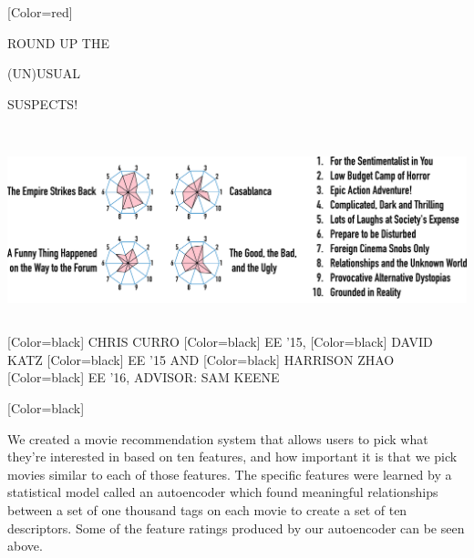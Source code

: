 \documentclass{article}
\begin{document}
\begin{minipage}[c]{28in}
{ 
[Color=red]
\fontsize{3.5in}{0.5in}\selectfont 
\bfseries





ROUND UP THE

\vspace{0.5in}

{ (UN)}USUAL 

\vspace{0.5in}

SUSPECTS!

}
\end{minipage}
\vspace{1in}\\
\colorbox{white}{
\begin{minipage}{28in}
\centering
\includegraphics[width=27in]{figure.pdf}
\end{minipage}
}
\vspace{1in}\\
{
[Color=black]
\fontsize{1in}{1em}\selectfont 
CHRIS CURRO
}
{
[Color=black]
\fontsize{0.8in}{1em}\selectfont 
EE '15,
}
{
[Color=black]
\fontsize{1in}{1em}\selectfont 
DAVID KATZ
}
{
[Color=black]
\fontsize{0.8in}{1em}\selectfont 
EE '15 AND
}
{
[Color=black]
\fontsize{1in}{1em}\selectfont 
HARRISON ZHAO
}
{
[Color=black]
\fontsize{0.8in}{1em}\selectfont 
EE '16, ADVISOR: SAM KEENE
}
\vspace{0.8in}\\
\begin{minipage}{15.5in}
{
	[Color=black]
	\fontsize{0.6in}{8em}\selectfont

	We created a movie recommendation system that allows users to pick what
	they're interested in based on ten features, and how important it is that we
	pick movies similar to each of those features. The specific features were
	learned by a statistical model called an autoencoder which found
	meaningful relationships between a set of one thousand tags on each movie
	to create a set of ten descriptors. Some of the feature ratings produced by
	our autoencoder can be seen above.


}
\end{minipage} 
\end{document}
